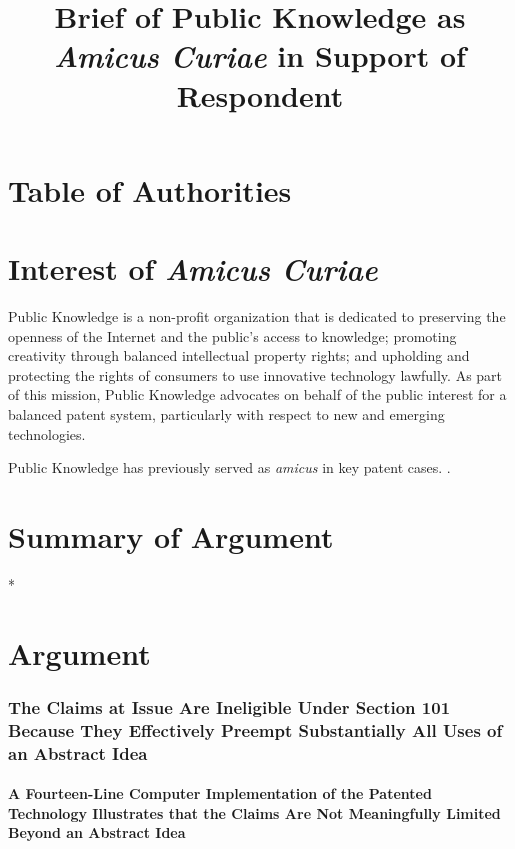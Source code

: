 \documentclass{scotus}
\title{Brief of Public Knowledge as
\protect\\\emph{Amicus Curiae} in Support of Respondent}
\begin{document}
\maketitle

\romanpagenumbers
\tableofcontents

\part{Table of Authorities}

\tableofauthorities

\clearpage
\arabicpagenumbers

\part{Interest of \emph{Amicus Curiae}}

Public Knowledge is a non-profit organization that is dedicated to preserving
the openness of the Internet and the public's access to knowledge; promoting
creativity through balanced intellectual property rights; and upholding and
protecting the rights of consumers to use innovative technology lawfully. As
part of this mission, Public Knowledge advocates on behalf of the public
interest for a balanced patent system, particularly with respect to new and
emerging technologies.

Public Knowledge has previously served as \emph{amicus} in key patent cases.
.


\part{Summary of Argument}

*

\part{Argument}

\section{The Claims at Issue Are Ineligible Under Section 101 Because They
Effectively Preempt Substantially All Uses of an Abstract Idea}

\subsection{A Fourteen-Line Computer Implementation of the Patented Technology
Illustrates that the Claims Are Not Meaningfully Limited Beyond an Abstract
Idea}
\end{document}
